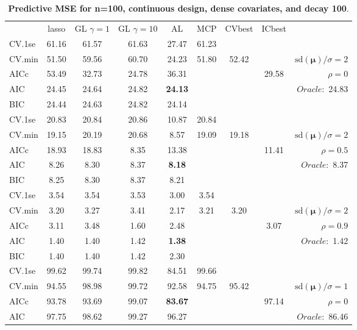 \begin{table}\vspace{-.5cm}
\caption[l]{ { \bf Predictive MSE for n=100, continuous design, 
dense covariates, and  decay  100}.}
\vspace{-.5cm}
\footnotesize{}
\begin{center}
\begin{tabular}{l*{7}{c}|r}
 & lasso & GL $\gamma=1$ & GL $\gamma=10$ & AL & MCP  & CVbest & ICbest  \\
\cline{1-9}
CV.1se & 61.16 & 61.57 & 61.63 & 27.47 & 61.23 & & & \\
CV.min & 51.50 & 59.56 & 60.70 & 24.23 & 51.80 & 52.42 & & $\mathrm{sd}(\mathbf{\mu})/\sigma=2$ \\
AICc & 53.49 & 32.73 & 24.78 & 36.31 & & & 29.58 &  $\rho=0$ \\
AIC & 24.45 & 24.64 & 24.82 & {\bf 24.13} & & & &  \multirow{2}{*}{$Oracle: $ 24.83} \\
BIC & 24.44 & 24.63 & 24.82 & 24.14 & & & &  \\
 \hline 
CV.1se & 20.83 & 20.84 & 20.86 & 10.87 & 20.84 & & & \\
CV.min & 19.15 & 20.19 & 20.68 & 8.57 & 19.09 & 19.18 & & $\mathrm{sd}(\mathbf{\mu})/\sigma=2$ \\
AICc & 18.93 & 18.83 & 8.35 & 13.38 & & & 11.41 &  $\rho=0.5$ \\
AIC & 8.26 & 8.30 & 8.37 & {\bf 8.18} & & & &  \multirow{2}{*}{$Oracle: $ 8.37} \\
BIC & 8.25 & 8.30 & 8.37 & 8.21 & & & &  \\
 \hline 
CV.1se & 3.54 & 3.54 & 3.53 & 3.00 & 3.54 & & & \\
CV.min & 3.20 & 3.27 & 3.41 & 2.17 & 3.21 & 3.20 & & $\mathrm{sd}(\mathbf{\mu})/\sigma=2$ \\
AICc & 3.11 & 3.48 & 1.60 & 2.48 & & & 3.07 &  $\rho=0.9$ \\
AIC & 1.40 & 1.40 & 1.42 & {\bf 1.38} & & & &  \multirow{2}{*}{$Oracle: $ 1.42} \\
BIC & 1.40 & 1.40 & 1.42 & 2.30 & & & &  \\
 \hline 
CV.1se & 99.62 & 99.74 & 99.82 & 84.51 & 99.66 & & & \\
CV.min & 94.55 & 98.98 & 99.72 & 92.58 & 94.75 & 95.42 & & $\mathrm{sd}(\mathbf{\mu})/\sigma=1$ \\
AICc & 93.78 & 93.69 & 99.07 & {\bf 83.67} & & & 97.14 &  $\rho=0$ \\
AIC & 97.75 & 98.62 & 99.27 & 96.27 & & & &  \multirow{2}{*}{$Oracle: $ 86.46} \\

\end{tabular}
\end{center}
\end{table}

